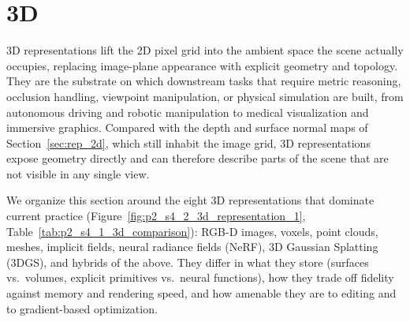 \section{3D}
\label{sec:rep_3d}

 3D representations lift the 2D pixel grid into the ambient space the scene actually occupies, replacing image-plane appearance with explicit geometry and topology.
They are the substrate on which downstream tasks that require metric reasoning, occlusion handling, viewpoint manipulation, or physical simulation are built, from autonomous driving and robotic manipulation to medical visualization and immersive graphics.
Compared with the depth and surface normal maps of Section~\ref{sec:rep_2d}, which still inhabit the image grid, 3D representations expose geometry directly and can therefore describe parts of the scene that are not visible in any single view.

We organize this section around the eight 3D representations that dominate current practice (Figure~\ref{fig:p2_s4_2_3d_representation_1}, Table~\ref{tab:p2_s4_1_3d_comparison}): RGB-D images, voxels, point clouds, meshes, implicit fields, neural radiance fields (NeRF), 3D Gaussian Splatting (3DGS), and hybrids of the above.
They differ in what they store (surfaces vs.\ volumes, explicit primitives vs.\ neural functions), how they trade off fidelity against memory and rendering speed, and how amenable they are to editing and to gradient-based optimization.

